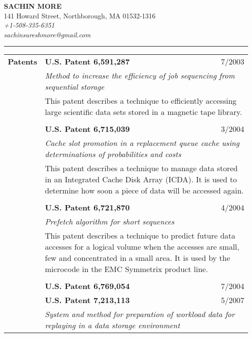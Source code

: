 \documentclass[10pt]{article}
\begin{document}
\begin{center}
{\bf \Large SACHIN MORE} \\
141 Howard Street, Northborough, MA 01532-1316 \\
{ \em +1-508-335-6351} \\
{\em sachinsureshmore@gmail.com}
\end{center}
\rule{\textwidth}{1pt}


\begin{longtable}{p{ 90pt}p{299pt}r}
{\bf Patents}       & {\bf U.S. Patent 6,591,287} & 7/2003 \\
                    & \multicolumn{2}{p{4.5in}}{\em Method to increase the efficiency of job sequencing from sequential storage}\\
                    & \multicolumn{2}{p{4.5in}}{This patent describes a technique to efficiently accessing large scientific data sets
						 stored in a magnetic tape library.} \\
\\
                    & {\bf U.S. Patent 6,715,039} & 3/2004 \\
                    & \multicolumn{2}{p{4.5in}}{\em Cache slot promotion in a replacement queue cache using determinations of probabilities and costs}\\
                    & \multicolumn{2}{p{4.5in}}{This patent describes a technique to manage data stored in an Integrated Cache Disk Array (ICDA). It 
						is used to determine how soon a piece of data will be accessed again.}\\
\\
                    & {\bf U.S. Patent 6,721,870} & 4/2004 \\
                    & \multicolumn{2}{p{4.5in}}{\em Prefetch algorithm for short sequences}\\
                    & \multicolumn{2}{p{4.5in}}{This patent describes a technique to predict future data accesses for a logical volume when the accesses
						 are small, few and concentrated in a small area. It is used by the microcode in the EMC Symmetrix product
						line.}\\
\\
                    & {\bf U.S. Patent 6,769,054} & 7/2004 \\
                    & {\bf U.S. Patent 7,213,113} & 5/2007 \\
                    & \multicolumn{2}{p{4.5in}}{\em System and method for preparation of workload data for replaying in a data storage environment}\\

\end{longtable}
\end{document}
